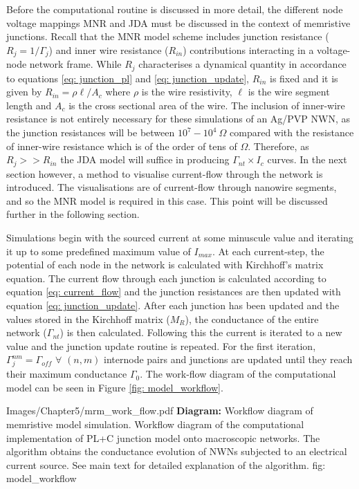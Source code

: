 Before the computational routine is discussed in more detail, the different node voltage mappings MNR and JDA must be discussed in the context of memristive junctions. Recall that the MNR model scheme includes junction resistance ($R_j = 1/\Gamma_j$) and inner wire resistance ($R_{in}$) contributions interacting in a voltage-node network frame. While $R_j$ characterises a dynamical quantity in accordance to equations \ref{eq: junction_pl} and \ref{eq: junction_update}, $R_{in}$ is fixed and it is given by $R_{in} = \rho \ell/A_c$ where $\rho$ is the wire resistivity, $\ell$ is the wire segment length and $A_c$ is the cross sectional area of the wire. The inclusion of inner-wire resistance is not entirely necessary for these simulations of an Ag/PVP NWN, as the junction resistances will be between $10^7 -10^4 ~\Omega$ compared with the resistance of inner-wire resistance which is of the order of tens of $\Omega$. Therefore, as $R_j >> R_{in}$ the JDA model will suffice in producing $\Gamma_{nt} \times I_c$ curves. In the next section however, a method to visualise current-flow through the network is introduced. The visualisations are of current-flow through nanowire segments, and so the MNR model is required in this case. This point will be discussed further in the following section.

Simulations begin with the sourced current at some minuscule value and iterating it up to some predefined maximum value of $I_{max}$. At each current-step, the potential of each node in the network is calculated with Kirchhoff's matrix equation. The current flow through each junction is calculated according to equation \ref{eq: current_flow} and the junction resistances are then updated with equation \ref{eq: junction_update}. After each junction has been updated and the values stored in the Kirchhoff matrix ($M_R$), the conductance of the entire network ($\Gamma_{nt}$) is then calculated. Following this the current is iterated to a new value and the junction update routine is repeated. For the first iteration, $\Gamma^{\textit{nm}}_j = \Gamma_{off}$ $\forall\,\, (n,m)$ internode pairs and junctions are updated until they reach their maximum conductance $\Gamma_0$. The work-flow diagram of the computational model can be seen in Figure \ref{fig: model_workflow}.

{Images/Chapter5/mrm_work_flow.pdf}
{\textbf{Diagram:} Workflow diagram of memristive model simulation.}
{Workflow diagram of the computational implementation of PL+C junction model onto macroscopic networks. The algorithm obtains the conductance evolution of NWNs subjected to an electrical current source. See main text for detailed explanation of the algorithm.}
{fig: model_workflow}

